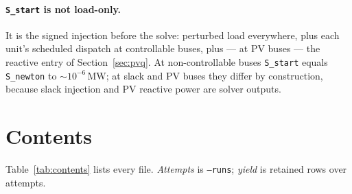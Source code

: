 \documentclass{article}
\begin{document}
\paragraph{\texttt{S\_start} is not load-only.}  It is the signed injection
before the solve: perturbed load everywhere, plus each unit's scheduled dispatch
at controllable buses, plus --- at PV buses --- the reactive entry of
Section~\ref{sec:pvq}.  At non-controllable buses \texttt{S\_start} equals
\texttt{S\_newton} to ${\sim}10^{-6}$\,MW; at slack and PV buses they differ by
construction, because slack injection and PV reactive power are solver outputs.


\section{Contents}

Table~\ref{tab:contents} lists every file.  \emph{Attempts} is \texttt{--runs};
\emph{yield} is retained rows over attempts.
\end{document}
